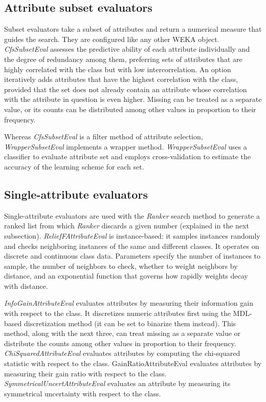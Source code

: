 \subsection{Attribute subset evaluators}

Subset evaluators take a subset of attributes and return a numerical
measure that guides the search. They are configured like any other
WEKA object. \textit{CfsSubsetEval} assesses the predictive ability of
each attribute individually and the degree of redundancy among them,
preferring sets of attributes that are highly correlated with the
class but with low intercorrelation. An option iteratively adds
attributes that have the highest correlation with the class, provided
that the set does not already contain an attribute whose correlation
with the attribute in question is even higher. Missing can be treated
as a separate value, or its counts can be distributed among other
values in proportion to their frequency.

Whereas \textit{CfsSubsetEval} is a filter method of attribute
selection, \textit{WrapperSubsetEval} implements a wrapper
method. \textit{WrapperSubsetEval} uses a classifier to evaluate
attribute set and employs cross-validation to estimate the accuracy of
the learning scheme for each set.

\subsection{Single-attribute evaluators}

Single-attribute evaluators are used with the \textit{Ranker} search
method to generate a ranked list from which \textit{Ranker} discards a
given number (explained in the next
subsection). \textit{ReliefFAttributeEval} is instance-based: it
samples instances randomly and checks neighboring instances of the
same and different classes. It operates on discrete and continuous
class data. Parameters specify the number of instances to sample, the
number of neighbors to check, whether to weight neighbors by distance,
and an exponential function that governs how rapidly weights decay
with distance.

\textit{InfoGainAttributeEval} evaluates attributes by measuring their
information gain with respect to the class. It discretizes numeric
attributes first using the MDL-based discretization method (it can be
set to binarize them instead). This method, along with the next three,
can treat missing as a separate value or distribute the counts among
other values in proportion to their
frequency. \textit{ChiSquaredAttributeEval} evaluates attributes by
computing the chi-squared statistic with respect to the
class. GainRatioAttributeEval evaluates attributes by measuring their
gain ratio with respect to the
class. \textit{SymmetricalUncertAttributeEval} evaluates an attribute
by measuring its symmetrical uncertainty with respect to the class.

